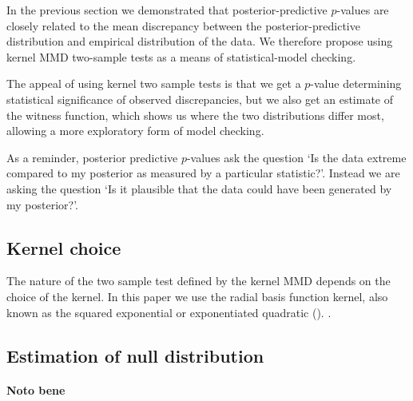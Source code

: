 \documentclass{article} %
\begin{document}
In the previous section we demonstrated that posterior-predictive $p$-values are closely related to the mean discrepancy between the posterior-predictive distribution and empirical distribution of the data.
We therefore propose using kernel MMD two-sample tests as a means of statistical-model checking.

The appeal of using kernel two sample tests is that we get a $p$-value determining statistical significance of observed discrepancies, but we also get an estimate of the witness function, which shows us where the two distributions differ most, allowing a more exploratory form of model checking.

As a reminder, posterior predictive $p$-values ask the question `Is the data extreme compared to my posterior as measured by a particular statistic?'.
Instead we are asking the question `Is it plausible that the data could have been generated by my posterior?'.

\subsection{Kernel choice}

The nature of the two sample test defined by the kernel MMD depends on the choice of the kernel.
In this paper we use the radial basis function kernel, also known as the squared exponential or exponentiated quadratic ().
.


\subsection{Estimation of null distribution}


\paragraph{Noto bene}

\end{document}
